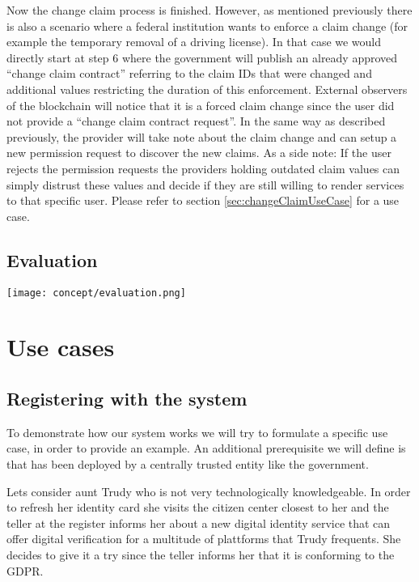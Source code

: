 Now the change claim process is finished. However, as mentioned previously there is also a scenario where a federal institution wants to enforce a claim change (for example the temporary removal of a driving license). In that case we would directly start at step 6 where the government will publish an already approved “change claim contract” referring to the claim IDs that were changed and additional values restricting the duration of this enforcement. External observers of the blockchain will notice that it is a forced claim change since the user did not provide a “change claim contract request”. In the same way as described previously, the provider will take note about the claim change and can setup a new permission request to discover the new claims. As a side note: If the user rejects the permission requests the providers holding outdated claim values can simply distrust these values and decide if they are still willing to render services to that specific user. Please refer to section \ref{sec:changeClaimUseCase} for a use case.

\subsection{Evaluation}

\texttt{[image: concept/evaluation.png]}
 
\section{Use cases}

\subsection{Registering with the system}
\label{ssec:registerWithSystem}
To demonstrate how our system works we will try to formulate a specific use case, in order to provide an example. An additional prerequisite we will define is that \projectName{} has been deployed by a centrally trusted entity like the government.

Lets consider aunt Trudy who is not very technologically knowledgeable. In order to refresh her identity card she visits the citizen center closest to her and the teller at the register informs her about a new digital identity service that can offer digital verification for a multitude of plattforms that Trudy frequents. She decides to give it a try since the teller informs her that it is conforming to the GDPR\cite{gdpr}.

